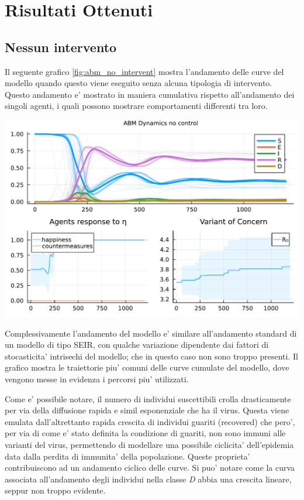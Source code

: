 \section{Risultati Ottenuti}

\subsection{Nessun intervento}
Il seguente grafico \ref{fig:abm_no_intervent} mostra l'andamento delle curve del modello
quando questo viene eseguito senza alcuna tipologia di intervento. Questo andamento e' mostrato 
in maniera cumulativa rispetto all'andamento dei singoli agenti, i quali possono mostrare comportamenti 
differenti tra loro.

\begin{minipage}{\linewidth}
	\centering
	\includegraphics[width=\textwidth]{img/SocialNetworkABM_NO_CONTROL.pdf}
	\label{fig:abm_no_intervent}
\end{minipage}

Complessivamente l'andamento del modello e' similare all'andamento standard di un modello di tipo  
SEIR, con qualche variazione dipendente dai fattori di stocasticita' intrisechi del modello; che in questo
caso non sono troppo presenti. Il grafico mostra le traiettorie piu' comuni delle curve cumulate del modello, 
dove vengono messe in evidenza i percorsi piu' utilizzati. 

Come e' possibile notare, il numero di individui suscettibili crolla drasticamente
per via della diffusione rapida e simil esponenziale che ha il virus. Questa viene emulata
dall'altrettanto rapida crescita di individui guariti (recovered) che pero', per via
di come e' stato definita la condizione di guariti, non sono immuni alle varianti del virus, permettendo 
di modellare una possibile ciclicita' dell'epidemia data dalla perdita di immunita' della popolazione. 
Queste proprieta' contribuiscono ad un andamento ciclico delle curve. Si puo' notare come 
la curva associata all'andamento degli individui nella classe \emph{D} abbia una crescita lineare, 
seppur non troppo evidente.

